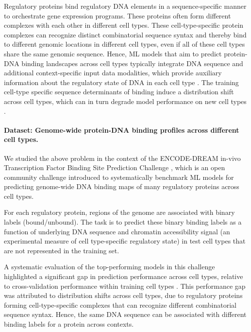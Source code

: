 Regulatory proteins bind regulatory DNA elements in a sequence-specific manner to orchestrate gene expression programs.
These proteins often form different complexes with each other in different cell types.
These cell-type-specific protein complexes can recognize distinct combinatorial sequence syntax and thereby bind to different genomic locations in different cell types, even if all of these cell types share the same genomic sequence.
Hence, ML models that aim to predict protein-DNA binding landscapes across cell types typically integrate DNA sequence and additional context-specific input data modalities, which provide auxiliary information about the regulatory state of DNA in each cell type \citep{srivastava2020sequence}.
The training cell-type specific sequence determinants of binding induce a distribution shift across cell types, which can in turn degrade model performance on new cell types \citep{EDneurips17, li2019anchor, li2019leopard, keilwagen2019accurate, quang2019factornet}.

\paragraph{Dataset: Genome-wide protein-DNA binding profiles across different cell types. }
We studied the above problem in the context of the ENCODE-DREAM in-vivo Transcription Factor Binding Site Prediction Challenge \citep{EDsynapse},
which is an open community challenge introduced to systematically benchmark ML models for predicting genome-wide DNA binding maps of many regulatory proteins across cell types.

For each regulatory protein, regions of the genome are associated with binary labels (bound/unbound).
The task is to predict these binary binding labels as a function of underlying DNA sequence and chromatin accessibility signal (an experimental measure of cell type-specific regulatory state) in test cell types that are not represented in the training set.

A systematic evaluation of the top-performing models in this challenge highlighted a significant gap in prediction performance across cell types, relative to cross-validation performance within training cell types \citep{li2019anchor, li2019leopard, keilwagen2019accurate, quang2019factornet}.
This performance gap was attributed to distribution shifts across cell types, due to regulatory proteins forming cell-type-specific complexes that can recognize different combinatorial sequence syntax.
Hence, the same DNA sequence can be associated with different binding labels for a protein across contexts.

